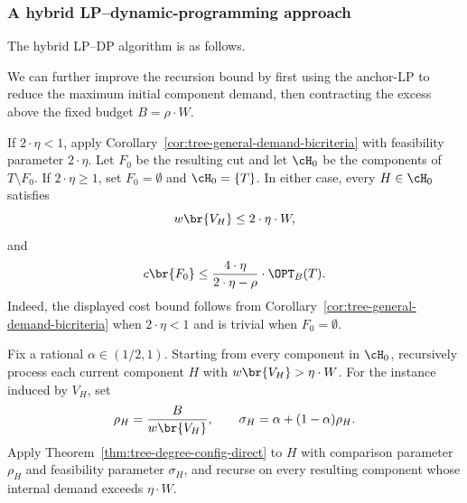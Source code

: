 \subsubsection{A hybrid LP--dynamic-programming approach}

The hybrid LP--DP algorithm is as follows.



We can further improve the recursion bound by first using the anchor-LP to reduce the maximum initial component demand, then contracting the excess above the fixed budget $B=\rho\cdot W$.

If $2\cdot\eta<1$, apply Corollary~\ref{cor:tree-general-demand-bicriteria} with feasibility parameter $2\cdot\eta$. Let $F_0$ be the resulting cut and let $\cH_0$ be the components of $T\setminus F_0$. If $2\cdot\eta\geq1$, set $F_0=\emptyset$ and $\cH_0=\{T\}$. In either case, every $H\in\cH_0$ satisfies
\[
    w\br{V_H}\leq2\cdot\eta\cdot W,
\]
and
\begin{equation}\label{eq:tree-hybrid-normalization-cost}
    c\br{F_0}
    \leq
    \frac{4\cdot\eta}{2\cdot\eta-\rho}\cdot\OPT_B(T).
\end{equation}
Indeed, the displayed cost bound follows from Corollary~\ref{cor:tree-general-demand-bicriteria} when $2\cdot\eta<1$ and is trivial when $F_0=\emptyset$.

Fix a rational $\alpha\in(1/2,1)$. Starting from every component in $\cH_0$, recursively process each current component $H$ with $w\br{V_H}>\eta\cdot W$. For the instance induced by $V_H$, set
\[
    \rho_H=\frac{B}{w\br{V_H}},
    \qquad
    \sigma_H=\alpha+(1-\alpha)\rho_H.
\]
Apply Theorem~\ref{thm:tree-degree-config-direct} to $H$ with comparison parameter $\rho_H$ and feasibility parameter $\sigma_H$, and recurse on every resulting component whose internal demand exceeds $\eta\cdot W$.

